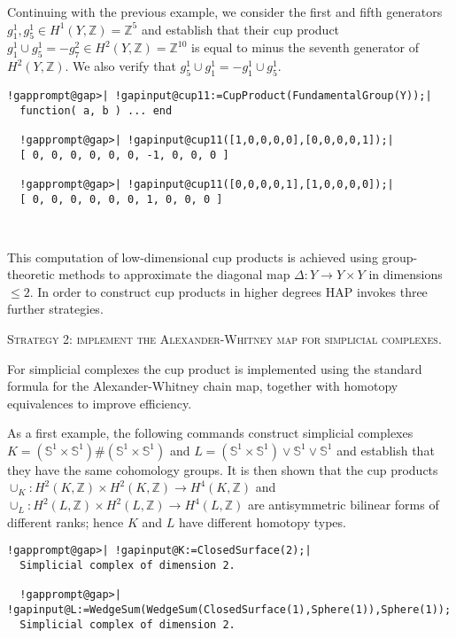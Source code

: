 \documentclass[a4paper,11pt]{report}
\begin{document}
{{Continuing with the previous example, we consider the first and fifth
generators $g_1^1, g_5^1\in H^1(Y,\mathbb Z) =\mathbb Z^5$ and establish that their cup product $ g_1^1 \cup g_5^1 = - g_7^2 \in H^2(Y,\mathbb Z) =\mathbb Z^{10}$ is equal to minus the seventh generator of $H^2(Y,\mathbb Z)$. We also verify that $g_5^1\cup g_1^1 = - g_1^1 \cup g_5^1$. 
\begin{Verbatim}[commandchars=!@|,fontsize=\small,frame=single,label=Example]
  !gapprompt@gap>| !gapinput@cup11:=CupProduct(FundamentalGroup(Y));|
  function( a, b ) ... end
  
  !gapprompt@gap>| !gapinput@cup11([1,0,0,0,0],[0,0,0,0,1]);|
  [ 0, 0, 0, 0, 0, 0, -1, 0, 0, 0 ]
  
  !gapprompt@gap>| !gapinput@cup11([0,0,0,0,1],[1,0,0,0,0]);|
  [ 0, 0, 0, 0, 0, 0, 1, 0, 0, 0 ]
  
  
\end{Verbatim}
 

This computation of low-dimensional cup products is achieved using
group-theoretic methods to approximate the diagonal map $\Delta \colon Y \rightarrow Y\times Y$ in dimensions $\le 2$. In order to construct cup products in higher degrees \textsc{HAP} invokes three further strategies. 

\textsc{Strategy 2: implement the Alexander-Whitney map for simplicial complexes.} 

For simplicial complexes the cup product is implemented using the standard
formula for the Alexander-Whitney chain map, together with homotopy
equivalences to improve efficiency. 

As a first example, the following commands construct simplicial complexes $K=(\mathbb S^1 \times \mathbb S^1) \# (\mathbb S^1 \times \mathbb S^1)$ and $L=(\mathbb S^1 \times \mathbb S^1) \vee \mathbb S^1 \vee \mathbb S^1$ and establish that they have the same cohomology groups. It is then shown that
the cup products $\cup_K\colon H^2(K,\mathbb Z)\times H^2(K,\mathbb Z) \rightarrow H^4(K,\mathbb
Z)$ and $\cup_L\colon H^2(L,\mathbb Z)\times H^2(L,\mathbb Z) \rightarrow H^4(L,\mathbb
Z)$ are antisymmetric bilinear forms of different ranks; hence $K$ and $L$ have different homotopy types. 
\begin{Verbatim}[commandchars=!@|,fontsize=\small,frame=single,label=Example]
  !gapprompt@gap>| !gapinput@K:=ClosedSurface(2);|
  Simplicial complex of dimension 2.
  
  !gapprompt@gap>| !gapinput@L:=WedgeSum(WedgeSum(ClosedSurface(1),Sphere(1)),Sphere(1));|
  Simplicial complex of dimension 2.
  

\end{Verbatim}}}
\end{document}

